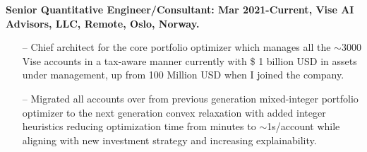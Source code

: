 \documentclass[letterpaper, 12pt]{article}
\renewenvironment{itemize}{
  \begin{list}{}{
    \setlength{\leftmargin}{1.5em}
  }
}{
  \end{list}
}
\begin{document}
\begin{itemize}
  \item \textbf{Senior Quantitative Engineer/Consultant: Mar 2021-Current, Vise AI Advisors, LLC, Remote, Oslo, Norway. }
  \begin{enumerate}
       \item[--] Chief architect for the core portfolio optimizer which manages all the $\sim$3000 Vise accounts in a tax-aware manner currently with \$ 1 billion USD in assets under management, up from 100 Million USD when I joined the company. 
       \item[--] Migrated all accounts over from previous generation mixed-integer portfolio optimizer to the next generation convex relaxation with added integer heuristics reducing optimization time from minutes to $\sim$1s/account while aligning with new investment strategy and increasing explainability.
   \end{enumerate}
  

\end{itemize}
\end{document}
